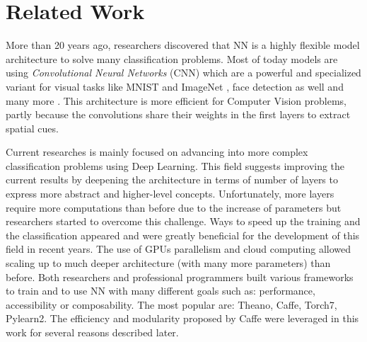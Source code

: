 \documentclass[a4paper,12pt]{report}
\begin{document}
\chapter{Related Work}
\label{chap:related}

More than 20 years ago, researchers discovered that NN is a highly flexible model architecture to solve many classification problems.
Most of today models are using {\em Convolutional Neural Networks} (CNN) which are a powerful and specialized variant for visual tasks like MNIST \cite{mnist_web} and ImageNet \cite{krizhevsky2012imagenet}, face detection as well \cite{rowley1998neural} and many more \cite{prechelt1994proben1}.
This architecture is more efficient for Computer Vision problems, partly because the convolutions share their weights in the first layers to extract spatial cues.

Current researches is mainly focused on advancing into more complex classification problems using Deep Learning.
This field suggests improving the current results by deepening the architecture in terms of number of layers to express more abstract and higher-level concepts.
Unfortunately, more layers require more computations than before due to the increase of parameters but researchers started to overcome this challenge.
Ways to speed up the training and the classification appeared and were greatly beneficial for the development of this field in recent years\cite{ciresan2011flexible}\cite{schmidhuber2015deep}\cite{nasse2009face}.
The use of GPUs parallelism and cloud computing allowed scaling up to much deeper architecture (with many more parameters) than before\cite{coates2013deep}.
Both researchers and professional programmers built various frameworks to train and to use NN with many different goals such as: performance, accessibility or composability.
The most popular are: Theano\cite{bastien2012theano}, Caffe\cite{jia2014caffe}, Torch7\cite{collobert2011torch7}, Pylearn2\cite{goodfellow2013pylearn2}.
The efficiency and modularity proposed by Caffe were leveraged in this work for several reasons described later.
\end{document}
